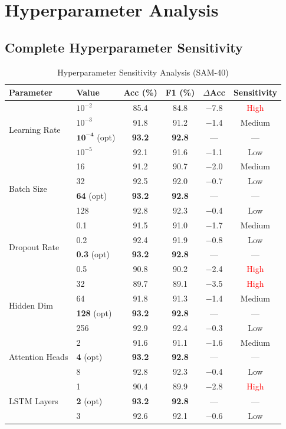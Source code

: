 \documentclass[11pt,a4paper]{article}
\begin{document}
\section{Hyperparameter Analysis}

\subsection{Complete Hyperparameter Sensitivity}

\begin{table}[H]
\centering
\caption{Hyperparameter Sensitivity Analysis (SAM-40)}
\small
\begin{tabular}{llcccc}
\toprule
\textbf{Parameter} & \textbf{Value} & \textbf{Acc (\%)} & \textbf{F1 (\%)} & \textbf{$\Delta$Acc} & \textbf{Sensitivity} \\
\midrule
\multirow{4}{*}{Learning Rate} & $10^{-2}$ & 85.4 & 84.8 & $-$7.8 & \textcolor{red}{High} \\
 & $10^{-3}$ & 91.8 & 91.2 & $-$1.4 & Medium \\
 & $\mathbf{10^{-4}}$ (opt) & \textbf{93.2} & \textbf{92.8} & --- & --- \\
 & $10^{-5}$ & 92.1 & 91.6 & $-$1.1 & Low \\
\midrule
\multirow{4}{*}{Batch Size} & 16 & 91.2 & 90.7 & $-$2.0 & Medium \\
 & 32 & 92.5 & 92.0 & $-$0.7 & Low \\
 & \textbf{64} (opt) & \textbf{93.2} & \textbf{92.8} & --- & --- \\
 & 128 & 92.8 & 92.3 & $-$0.4 & Low \\
\midrule
\multirow{4}{*}{Dropout Rate} & 0.1 & 91.5 & 91.0 & $-$1.7 & Medium \\
 & 0.2 & 92.4 & 91.9 & $-$0.8 & Low \\
 & \textbf{0.3} (opt) & \textbf{93.2} & \textbf{92.8} & --- & --- \\
 & 0.5 & 90.8 & 90.2 & $-$2.4 & \textcolor{red}{High} \\
\midrule
\multirow{4}{*}{Hidden Dim} & 32 & 89.7 & 89.1 & $-$3.5 & \textcolor{red}{High} \\
 & 64 & 91.8 & 91.3 & $-$1.4 & Medium \\
 & \textbf{128} (opt) & \textbf{93.2} & \textbf{92.8} & --- & --- \\
 & 256 & 92.9 & 92.4 & $-$0.3 & Low \\
\midrule
\multirow{3}{*}{Attention Heads} & 2 & 91.6 & 91.1 & $-$1.6 & Medium \\
 & \textbf{4} (opt) & \textbf{93.2} & \textbf{92.8} & --- & --- \\
 & 8 & 92.8 & 92.3 & $-$0.4 & Low \\
\midrule
\multirow{3}{*}{LSTM Layers} & 1 & 90.4 & 89.9 & $-$2.8 & \textcolor{red}{High} \\
 & \textbf{2} (opt) & \textbf{93.2} & \textbf{92.8} & --- & --- \\
 & 3 & 92.6 & 92.1 & $-$0.6 & Low \\
\bottomrule
\end{tabular}
\end{table}
\end{document}
